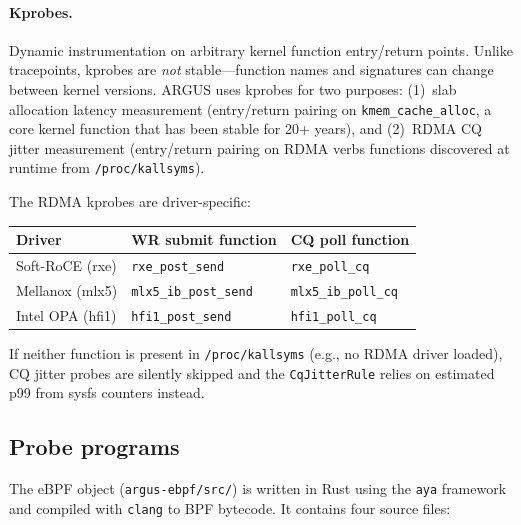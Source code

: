 \documentclass[11pt]{article}
\begin{document}
\paragraph{Kprobes.}
Dynamic instrumentation on arbitrary kernel function entry/return points.
Unlike tracepoints, kprobes are \emph{not} stable---function names and
signatures can change between kernel versions. ARGUS uses kprobes for two
purposes: (1)~slab allocation latency measurement (entry/return pairing on
\texttt{kmem\_cache\_alloc}, a core kernel function that has been stable
for 20+ years), and (2)~RDMA CQ jitter measurement (entry/return pairing
on RDMA verbs functions discovered at runtime from \texttt{/proc/kallsyms}).

The RDMA kprobes are driver-specific:

\begin{center}
\small
\begin{tabular}{lll}
\toprule
Driver & WR submit function & CQ poll function \\
\midrule
Soft-RoCE (rxe)  & \texttt{rxe\_post\_send}    & \texttt{rxe\_poll\_cq} \\
Mellanox (mlx5)  & \texttt{mlx5\_ib\_post\_send} & \texttt{mlx5\_ib\_poll\_cq} \\
Intel OPA (hfi1) & \texttt{hfi1\_post\_send}    & \texttt{hfi1\_poll\_cq} \\
\bottomrule
\end{tabular}
\end{center}

If neither function is present in \texttt{/proc/kallsyms} (e.g., no RDMA
driver loaded), CQ jitter probes are silently skipped and the
\texttt{CqJitterRule} relies on estimated p99 from sysfs counters instead.

\subsection{Probe programs}

The eBPF object (\texttt{argus-ebpf/src/}) is written in Rust using the
\texttt{aya} framework and compiled with \texttt{clang} to BPF bytecode.
It contains four source files:
\end{document}
